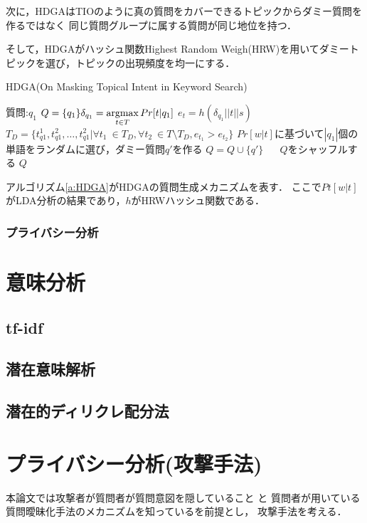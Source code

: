 \documentclass[master]{suribt}
\theoremstyle{definition}
\newcommand{\argmax}{\mathop{\rm argmax}\limits}
\begin{document}
 次に，HDGAはTIOのように真の質問をカバーできるトピックからダミー質問を作るではなく
 同じ質問グループに属する質問が同じ地位を持つ．

 そして，HDGAがハッシュ関数Highest Random Weigh(HRW)\cite{}を用いてダミートピックを選び，トピックの出現頻度を均一にする．

 \begin{algorithm}
 \caption{HDGA(On Masking Topical Intent in Keyword Search)}
 \begin{algorithmic}[1]
  \Require 質問:$q_1$
  \State $Q = \{q_1\}\delta_{q_1} = \argmax_{t \in T} Pr[t|q_1]$
  \State $e_t = h(\delta_{q_1}||t||s)$
  \EndFor
  \State $T_D = \{t^1_{q1},t^2_{q1}, \dots , t^2_{q1} | \forall t_1 \ \in T_D , \forall t_2 \ \in T \setminus T_D, e_{t_1} > e_{t_2} \}$
  \While { $ \argmax_{t \in T} Pr[t|q'] \neq t$}
  \State $Pr[w|t]$に基づいて$|q_1|$個の単語をランダムに選び，ダミー質問$q'$を作る
  \EndWhile
  \State $Q = Q \cup \{q'\}$
  \EndFor　
  \State $Q$をシャッフルする
  \Ensure $Q$
 \end{algorithmic}
 \label{a:HDGA}
 \end{algorithm}

 アルゴリズム\ref{a:HDGA}がHDGAの質問生成メカニズムを表す．
 ここで$Pt[w|t]$がLDA分析の結果であり，$h$がHRWハッシュ関数である．

 \subsection{プライバシー分析}

 \chapter{意味分析} \label{s:sm}
 \section{tf-idf}
 \section{潜在意味解析}
 \section{潜在的ディリクレ配分法}

 \chapter{プライバシー分析(攻撃手法)}
 本論文では攻撃者が質問者が質問意図を隠していること
 と
 質問者が用いている質問曖昧化手法のメカニズムを知っているを前提とし，
 攻撃手法を考える．
\end{document}
